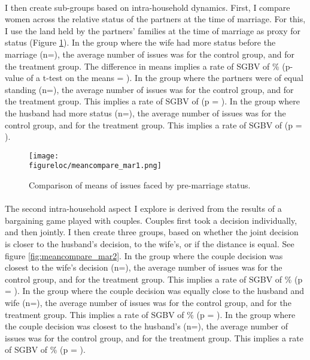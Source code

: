 \documentclass[10pt,a4paper]{scrartcl} %
\newcommand{\figureloc}{C:/Users/Koen/Dropbox/PhD/Papers/CongoGBV/Figures}
\begin{document}
\paragraph{}
I then create sub-groups based on intra-household dynamics. First, I compare women across the relative status of the partners at the time of marriage. For this, I use the land held by the partners' families at the time of marriage as proxy for status (Figure \ref{fig:meancompare_mar1}). In the group where the wife had more status before the marriage (n=), the average number of issues was  for the control group, and  for the treatment group. The difference in means implies a rate of SGBV of \% (p-value of a t-test on the means = ). In the group where the partners were of equal standing (n=), the average number of issues was  for the control group, and  for the treatment group. This implies a rate of SGBV of  (p = ). In the group where the husband had more status (n=), the average number of issues was  for the control group, and  for the treatment group. This implies a rate of SGBV of  (p = ).

\begin{figure}[H]
  \texttt{[image: \\figureloc/meancompare\_mar1.png]}
  \caption{Comparison of means of issues faced by pre-marriage status.}
  \label{fig:meancompare_mar1}
\end{figure}

\paragraph{}
The second intra-household aspect I explore is derived from the results of a bargaining game played with couples. Couples first took a decision individually, and then jointly. I then create three groups, based on whether the joint decision is closer to the husband's decision, to the wife's, or if the distance is equal. See figure \ref{fig:meancompare_mar2}. In the group where the couple decision was closest to the wife's decision (n=), the average number of issues was  for the control group, and  for the treatment group. This implies a rate of SGBV of \% (p = ). In the group where the couple decision was equally close to the husband and wife (n=), the average number of issues was  for the control group, and  for the treatment group. This implies a rate of SGBV of \% (p = ). In the group where the couple decision was closest to the husband's (n=), the average number of issues was  for the control group, and  for the treatment group. This implies a rate of SGBV of \% (p = ).
\end{document}
